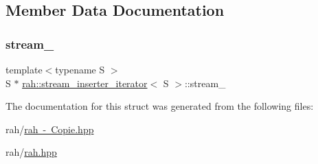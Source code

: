 \subsection{Member Data Documentation}
\mbox{\label{structrah_1_1stream__inserter__iterator_ab8594076013c695b314616093e8fdb4c}} 
\subsubsection{\texorpdfstring{stream\_}{stream\_}}
{\footnotesize\ttfamily template$<$typename S $>$ \\
S $\ast$ \mbox{\hyperlink{structrah_1_1stream__inserter__iterator}{rah\+::stream\+\_\+inserter\+\_\+iterator}}$<$ S $>$\+::stream\+\_\+}



The documentation for this struct was generated from the following files\+:\begin{DoxyCompactItemize}
\item 
rah/\mbox{\hyperlink{rah_01-_01_copie_8hpp}{rah -\/ Copie.\+hpp}}\item 
rah/\mbox{\hyperlink{rah_8hpp}{rah.\+hpp}}\end{DoxyCompactItemize}
